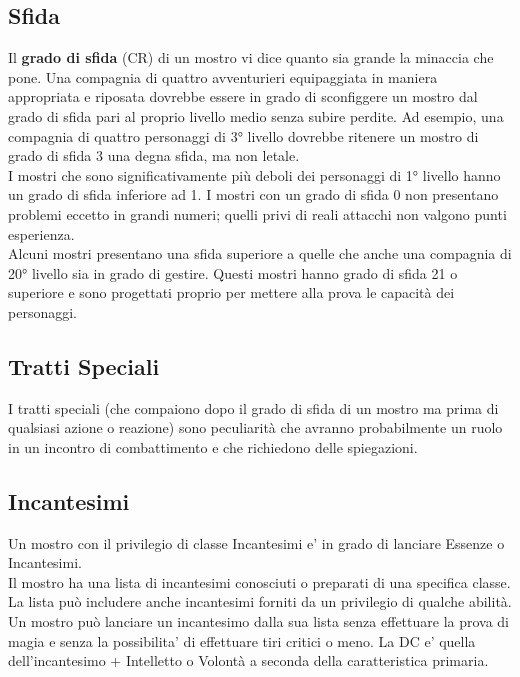 \begin{multicols}{2}
\subsection{Sfida}

Il \textbf{grado di sfida} (CR) di un mostro vi dice quanto sia grande la minaccia che pone. Una compagnia di quattro avventurieri equipaggiata in maniera appropriata e riposata dovrebbe essere in grado di sconfiggere un mostro dal grado di sfida pari al proprio livello medio senza subire perdite. Ad esempio, una compagnia di quattro personaggi di 3° livello dovrebbe ritenere un mostro di grado di sfida 3 una degna sfida, ma non letale.\\
I mostri che sono significativamente più deboli dei personaggi di 1° livello hanno un grado di sfida inferiore ad 1. I mostri con un grado di sfida 0 non presentano problemi eccetto in grandi numeri; quelli privi di reali attacchi non valgono punti esperienza.\\
Alcuni mostri presentano una sfida superiore a quelle che anche una compagnia di 20° livello sia in grado di gestire. Questi mostri hanno grado di sfida 21 o superiore e sono progettati proprio per mettere alla prova le capacità dei personaggi.\\

\subsection{Tratti Speciali}

I tratti speciali (che compaiono dopo il grado di sfida di un mostro ma prima di qualsiasi azione o reazione) sono peculiarità che avranno probabilmente un ruolo in un incontro di combattimento e che richiedono delle spiegazioni.

\subsection{Incantesimi}

Un mostro con il privilegio di classe Incantesimi e' in grado di lanciare Essenze o Incantesimi.\\
Il mostro ha una lista di incantesimi conosciuti o preparati di una specifica classe. La lista può includere anche incantesimi forniti da un privilegio di qualche abilità. \\
Un mostro può lanciare un incantesimo dalla sua lista senza effettuare la prova di magia e senza la possibilita' di effettuare tiri critici o meno. La DC e' quella dell'incantesimo + Intelletto o Volontà a seconda della caratteristica primaria.


\end{multicols}
